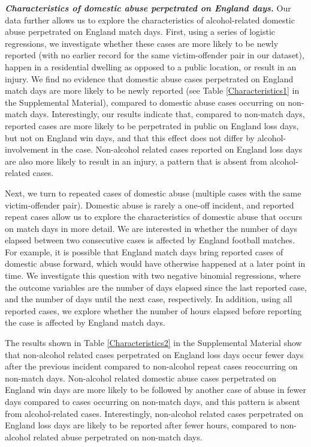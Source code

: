 \documentclass[12pt, a4paper]{article}
\begin{document}
\textbf{\textit{Characteristics of domestic abuse perpetrated on England days.}} Our data further allows us to explore the characteristics of alcohol-related domestic abuse perpetrated on England match days. First, using a series of logistic regressions, we investigate whether these cases are more likely to be newly reported (with no earlier record for the same victim-offender pair in our dataset), happen in a residential dwelling as opposed to a public location, or result in an injury. We find no evidence that domestic abuse cases perpetrated on England match days are more likely to be newly reported (see Table \ref{Characteristics1} in the Supplemental Material), compared to domestic abuse cases occurring on non-match days. Interestingly, our results indicate that, compared to non-match days, reported cases are more likely to be perpetrated in public on England loss days, but not on England win days, and that this effect does not differ by alcohol-involvement in the case. Non-alcohol related cases reported on England loss days are also more likely to result in an injury, a pattern that is absent from alcohol-related cases.

Next, we turn to repeated cases of domestic abuse (multiple cases with the same victim-offender pair). Domestic abuse is rarely a one-off incident, and reported repeat cases allow us to explore the characteristics of domestic abuse that occurs on match days in more detail. We are interested in whether the number of days elapsed between two consecutive cases is affected by England football matches. For example, it is possible that England match days bring reported cases of domestic abuse forward, which would have otherwise happened at a later point in time. We investigate this question with two negative binomial regressions, where the outcome variables are the number of days elapsed since the last reported case, and the number of days until the next case, respectively. In addition, using all reported cases, we explore whether the number of hours elapsed before reporting the case is affected by England match days.


The results shown in Table \ref{Characteristics2} in the Supplemental Material show that non-alcohol related cases perpetrated on England loss days occur fewer days after the previous incident compared to non-alcohol repeat cases reoccurring on non-match days. Non-alcohol related domestic abuse cases perpetrated on England win days are more likely to be followed by another case of abuse in fewer days compared to cases occurring on non-match days, and this pattern is absent from alcohol-related cases. Interestingly, non-alcohol related cases perpetrated on England loss days are likely to be reported after fewer hours, compared to non-alcohol related abuse perpetrated on non-match days. 
\end{document}
